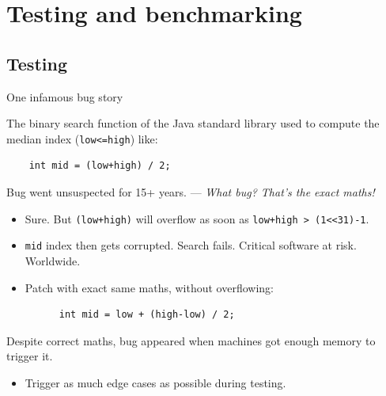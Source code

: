 \section{Testing and benchmarking}

\subsection{Testing}

\begin{frame}[fragile]{One infamous bug story}

  The binary search function of the Java standard library used to compute
  the median index (\lstinline{low<=high}) like:
  \begin{lstlisting}
    int mid = (low+high) / 2;
  \end{lstlisting}

  Bug went unsuspected for 15+ years.
  --- {\em What bug? That's the exact maths!}
  \begin{itemize}
  \item Sure. But \lstinline{(low+high)} will overflow as soon as \lstinline{low+high > (1<<31)-1}.
  \item \lstinline{mid} index then gets corrupted. Search fails. Critical software at risk. Worldwide.
  \item Patch with exact same maths, without overflowing:
    \begin{lstlisting}
      int mid = low + (high-low) / 2;
    \end{lstlisting}
  \end{itemize}

  Despite correct maths, bug appeared when machines got enough memory to trigger it.

  \begin{itemize}
  \item Trigger as much edge cases as possible during testing.
  \end{itemize}

\end{frame}


